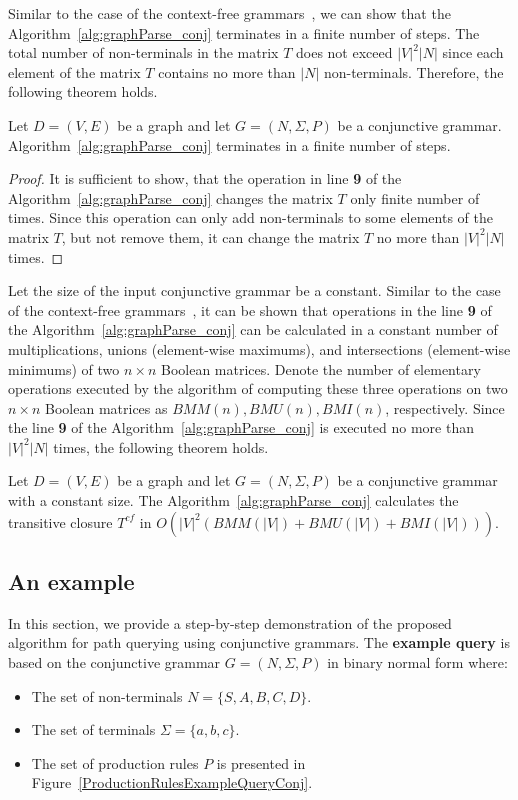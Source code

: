 Similar to the case of the context-free grammars~\cite{azimov2018context}, we can show that the Algorithm~\ref{alg:graphParse_conj} terminates in a finite number of steps. The total number of non-terminals in the matrix $T$ does not exceed $|V|^2|N|$ since each element of the matrix $T$ contains no more than $|N|$ non-terminals. Therefore, the following theorem holds.

\begin{mytheorem}\label{thm:finite_conj}
    Let $D = (V,E)$ be a graph and let $G =(N,\Sigma,P)$ be a conjunctive grammar. Algorithm~\ref{alg:graphParse_conj} terminates in a finite number of steps. 
\end{mytheorem}
\begin{proof}
    It is sufficient to show, that the operation in line \textbf{9} of the Algorithm~\ref{alg:graphParse_conj} changes the matrix $T$ only finite number of times. Since this operation can only add non-terminals to some elements of the matrix $T$, but not remove them, it can change the matrix $T$ no more than $|V|^2|N|$ times.
\end{proof}

Let the size of the input conjunctive grammar be a constant. Similar to the case of the context-free grammars~\cite{azimov2018context}, it can be shown that operations in the line \textbf{9} of the Algorithm~\ref{alg:graphParse_conj} can be calculated in a constant number of multiplications, unions (element-wise maximums), and intersections (element-wise minimums) of two $n \times n$ Boolean matrices. Denote the number of elementary operations executed by the algorithm of computing these three operations on two $n \times n$ Boolean matrices as $BMM(n), BMU(n), BMI(n)$, respectively. Since the line \textbf{9} of the Algorithm~\ref{alg:graphParse_conj} is executed no more than $|V|^2|N|$ times, the following theorem holds.

\begin{mytheorem}\label{thm:time_conj}
    Let $D = (V,E)$ be a graph and let $G =(N,\Sigma,P)$ be a conjunctive grammar with a constant size. The Algorithm~\ref{alg:graphParse_conj} calculates the transitive closure $T^{cf}$ in $O(|V|^2(BMM(|V|) + BMU(|V|) + BMI(|V|)))$.
\end{mytheorem}

\subsection{An example}
In this section, we provide a step-by-step demonstration of the proposed algorithm for path querying using conjunctive grammars. The \textbf{example query} is based on the conjunctive grammar $G = (N, \Sigma, P)$ in binary normal form where:
\begin{itemize}
    \item The set of non-terminals $N = \{S, A, B, C, D\}$.
    \item The set of terminals $\Sigma = \{a, b, c\}.$
    \item The set of production rules $P$ is presented in Figure~\ref{ProductionRulesExampleQueryConj}.
\end{itemize}

